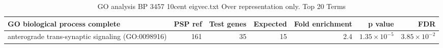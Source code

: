 \begin{table}[ht]
\centering
\begin{adjustbox}{width=\textwidth}
\begin{tabular}{lrrrrrr}
  \hline
GO biological process complete & PSP ref & Test genes & Expected & Fold enrichment & p value & FDR \\ 
  \hline
anterograde trans-synaptic signaling (GO:0098916) & 161 & 35 & 15 & 2.4 & $1.35 \times 10^{-5}$ & $3.85 \times 10^{-2}$ \\ 
   \hline
\end{tabular}
\end{adjustbox}
\caption{GO analysis BP 3457 10cent eigvec.txt Over representation only. Top 20 Terms} 
\label{tab:GO analysis BP 3457 10cent eigvec.txt Over representation only. Top 20 Terms}
\end{table}




